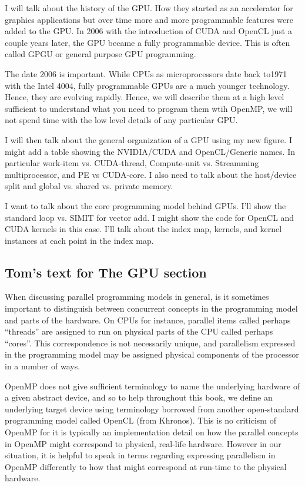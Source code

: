 I will talk about the history of the GPU.  How they started as an accelerator for graphics applications but over time
more and more programmable features were added to the GPU.  In 2006 with the introduction of CUDA and 
OpenCL just a couple years later, the GPU became a fully programmable device.   This is often called GPGU or
general purpose GPU programming.

The date 2006 is important.  While CPUs as microprocessors date back to1971 with the Intel 4004, fully
programmable GPUs are a much younger technology.  Hence, they are evolving rapidly.  Hence, we will describe them
at a high level sufficient to understand what you need to program them wtih OpenMP, we will not spend time with the low
level details of any particular GPU.   

I will then talk about the general organization of a GPU using my new figure.  I might add a table showing the NVIDIA/CUDA 
and OpenCL/Generic names.  In particular work-item vs. CUDA-thread, Compute-unit vs. Streamming multiprocessor, 
and PE vs CUDA-core.  I also need to talk about the host/device split and global vs. shared vs. private memory.

I want to talk about the core programming  model behind GPUs.  I'll show the standard loop vs. SIMIT for vector add.  I might
show the code for OpenCL and CUDA kernels in this case.  I'll talk about the index map, kernels, and kernel instances at each point
in the index map.


\subsection{Tom's text for The GPU section}

When discussing parallel programming models in general, is it sometimes important to distinguish between concurrent concepts in the programming model and parts of the hardware.
On CPUs for instance, parallel items called perhaps ``threads'' are assigned to run on physical parts of the CPU called perhaps ``cores''.
This correspondence is not necessarily unique, and parallelism expressed in the programming model may be assigned physical components of the processor in a number of ways.

OpenMP does not give sufficient terminology to name the underlying hardware of a given abstract device, and so to help throughout this book, we define an underlying target device using terminology borrowed from another open-standard programming model called OpenCL (from Khronos).
This is no criticism of OpenMP for it is typically an implementation detail on how the parallel concepts in OpenMP might correspond to physical, real-life hardware.
However in our situation, it is helpful to speak in terms regarding expressing parallelism in OpenMP differently to how that might correspond at run-time to the physical hardware.

